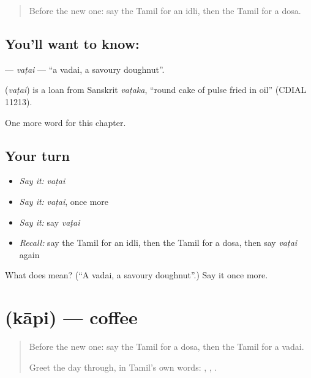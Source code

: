 \begin{quote}
Before the new one: say the Tamil for an idli, then the Tamil for a dosa.
\end{quote}

\subsection*{You'll want to know: }
\textbf{} — \emph{vaṭai} — \textquotedblleft{}a vadai, a savoury doughnut\textquotedblright{}.

\begin{cousinweb}
\textbf{} (\emph{vaṭai}) is a loan from Sanskrit \emph{vaṭaka}, \textquotedblleft{}round cake of pulse fried in oil\textquotedblright{} (CDIAL 11213).
\end{cousinweb}

\begin{grammarlens}[title={What you've built}]
One more word for this chapter.
\end{grammarlens}

\subsection*{Your turn}
\begin{itemize}
\raggedright
  \item \emph{Say it:} \emph{vaṭai}
  \item \emph{Say it:} \emph{vaṭai}, once more
  \item \emph{Say it:} say \emph{vaṭai}
  \item \emph{Recall:} say the Tamil for an idli, then the Tamil for a dosa, then say \emph{vaṭai} again
\end{itemize}

\begin{tcolorbox}[breakable,colback=teal!4,colframe=teal!35!black,title={Before you move on}]
What does  mean? (\textquotedblleft{}A vadai, a savoury doughnut\textquotedblright{}.) Say it once more.
\end{tcolorbox}
\section[\texorpdfstring{\ta{காபி} (kāpi)}{காபி (kāpi)}]{ (kāpi) — coffee}

\label{lesson:TA-C125-kapi}



\begin{quote}
Before the new one: say the Tamil for a dosa, then the Tamil for a vadai.

Greet the day through, in Tamil's own words: \textbf{ }, \textbf{ }, \textbf{ }.
\end{quote}

